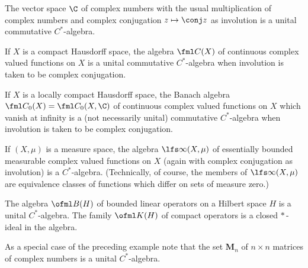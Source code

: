 \begin{exam}  The vector space $\C$ of complex numbers with the usual multiplication
of complex numbers and complex conjugation $z \mapsto \conj z$ as involution is a unital
commutative $C^*$-algebra.
\end{exam}

\begin{exam} If $X$ is a compact Hausdorff space, the algebra $\fml C(X)$ of continuous
complex valued functions on $X$ is a unital commutative $C^*$-algebra when involution is
taken to be complex conjugation.
\end{exam}

\begin{exam} If $X$ is a locally compact Hausdorff space, the Banach algebra
$\fml C_0(X) = \fml C_0(X,\C)$ of continuous complex valued functions on $X$ which vanish
at infinity is a (not necessarily unital) commutative $C^*$-algebra when involution is
taken to be complex conjugation.
\end{exam}

\begin{exam} If $(X,\mu)$ is a measure space, the algebra $\lfs\infty(X,\mu)$ of
essentially bounded measurable complex valued functions on $X$ (again with complex
conjugation as involution) is a $C^*$-algebra.  (Technically, of course, the members of
$\lfs\infty(X,\mu)$ are equivalence classes of functions which differ on sets of measure zero.)
\end{exam}

\begin{exam}\label{001305fa} The algebra $\ofml B(H)$ of bounded linear operators on a Hilbert space
$H$ is a unital $C^*$-algebra.  The family $\ofml K(H)$ of compact operators is a closed $*\,$-ideal
in the algebra.
\end{exam}

\begin{exam}\label{001306} As a special case of the preceding example note that the set
$\mathbf M_n$ of $n \times n$ matrices of complex numbers is a unital $C^*$-algebra.
\end{exam}

